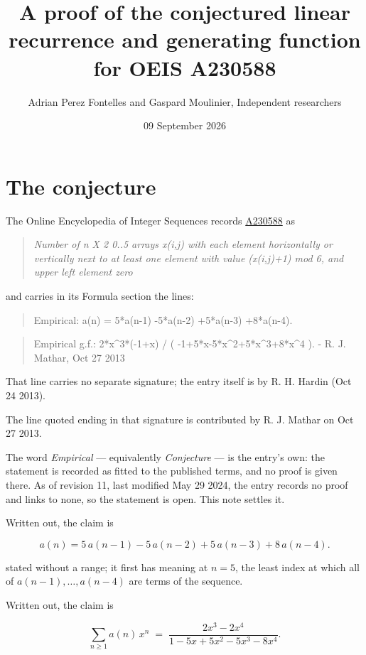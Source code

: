 \documentclass[11pt]{article}
\title{A proof of the conjectured linear recurrence and generating function for OEIS A230588}
\author{Adrian Perez Fontelles and Gaspard Moulinier, Independent researchers}
\date{09 September 2026}
\theoremstyle{definition}
\begin{document}
\maketitle
\section{The conjecture}

The Online Encyclopedia of Integer Sequences records \href{https://oeis.org/A230588}{A230588} as

\begin{quote}\itshape Number of n X 2 0..5 arrays x(i,j) with each element horizontally or vertically next to at least one element with value (x(i,j)+1) mod 6, and upper left element zero\end{quote}

and carries in its Formula section the lines:

\begin{quote}\ttfamily Empirical: a(n) = 5*a(n-1) -5*a(n-2) +5*a(n-3) +8*a(n-4).\end{quote}

\begin{quote}\ttfamily Empirical g.f.: 2*x\textasciicircum{}3*(-1+x) / ( -1+5*x-5*x\textasciicircum{}2+5*x\textasciicircum{}3+8*x\textasciicircum{}4 ). - R. J. Mathar, Oct 27 2013\end{quote}

That line carries no separate signature; the entry itself is by R. H. Hardin (Oct 24 2013).

The line quoted ending in that signature is contributed by R. J. Mathar on Oct 27 2013.

The word {\itshape Empirical} --- equivalently {\itshape Conjecture} --- is the entry's own: the statement is recorded as fitted to the published terms, and no proof is given there. As of revision 11, last modified May 29 2024, the entry records no proof and links to none, so the statement is open. This note settles it.

Written out, the claim is

\[a(n) = 5\,a(n-1) - 5\,a(n-2) + 5\,a(n-3) + 8\,a(n-4).\]

stated without a range; it first has meaning at $n = 5$, the least index at which all of $a(n-1),\dots,a(n-4)$ are terms of the sequence.

Written out, the claim is

\[\sum_{n \ge 1} a(n)\,x^n \;=\; \frac{2x^{3} - 2x^{4}}{1 - 5x + 5x^{2} - 5x^{3} - 8x^{4}}.\]
\end{document}
